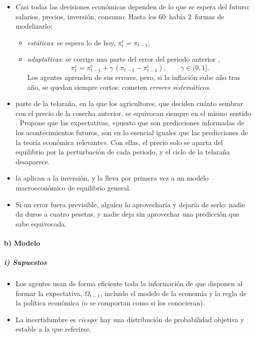 \documentclass[11pt]{article}
\begin{document}
\begin{itemize}
\item Casi todas las decisiones económicas dependen de lo que se espera del futuro: salarios, precios, inversión, consumo. Hasta los 60~había 2~formas de modelizarlo:
  \begin{itemize}
  \item \emph{estáticas}: se espera lo de hoy, $\pi^e_t=\pi_{t-1}$;
  \item \emph{adaptativas}: se corrige una parte del error del periodo anterior ,
  \begin{equation}\label{eq:adaptativas}
  \pi^e_t=\pi^e_{t-1}+\gamma\,(\pi_{t-1}-\pi^e_{t-1}),\qquad \gamma\in(0,1].
  \end{equation}
  Los agentes aprenden de sus errores, pero, si la inflación sube año tras año, se quedan siempre cortos: cometen \emph{errores sistemáticos}.
  \end{itemize}
\item \textcite{Muth1961Rational} parte de la telaraña, en la que los agricultores, que deciden cuánto sembrar con el precio de la cosecha anterior, se equivocan siempre en el mismo sentido . Propone que las expectativas, «puesto que son predicciones informadas de los acontecimientos futuros, son en lo esencial iguales que las predicciones de la teoría económica relevante»\nocite{Muth1961Rational}. Con ellas, el precio solo se aparta del equilibrio por la perturbación de cada periodo, y el ciclo de la telaraña desaparece.
\item \textcite{LucasPrescott1971Investment} la aplican a la inversión, y \textcite{Lucas1972Expectations} la lleva por primera vez a un modelo macroeconómico de equilibrio general.
\item Si un error fuera previsible, alguien lo aprovecharía y dejaría de serlo: nadie da duros a cuatro pesetas, y nadie deja sin aprovechar una predicción que sabe equivocada.
\end{itemize}

\paragraph{b) Modelo}

\subparagraph{i) Supuestos}

\begin{itemize}
\item Los agentes usan de forma eficiente toda la información de que disponen al formar la expectativa, $\Omega_{t-1}$, incluido el modelo de la economía y la regla de la política económica (o se comportan como si los conocieran).
\item La incertidumbre es \emph{riesgo}: hay una distribución de probabilidad objetiva y estable a la que referirse.
\end{itemize}
\end{document}
